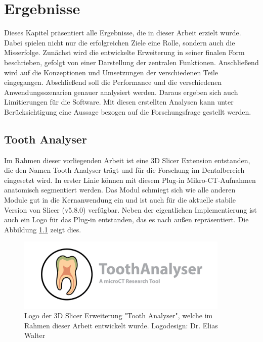 \chapter{Ergebnisse}
\label{chap:ergebnisse} Dieses Kapitel präsentiert alle Ergebnisse, die in
dieser Arbeit erzielt wurde. Dabei spielen nicht nur die erfolgreichen Ziele eine
Rolle, sondern auch die Misserfolge. Zunächst wird die entwickelte Erweiterung in
seiner finalen Form beschrieben, gefolgt von einer Darstellung der zentralen
Funktionen. Anschließend wird auf die Konzeptionen und Umsetzungen der verschiedenen
Teile eingegangen. Abschließend soll die Performance und die verschiedenen
Anwendungsszenarien genauer analysiert werden. Daraus ergeben sich auch Limitierungen
für die Software. Mit diesen erstellten Analysen kann unter Berücksichtigung
eine Aussage bezogen auf die Forschungsfrage gestellt werden.

\section{Tooth Analyser}
\label{sec:tooth_analyser} Im Rahmen dieser vorliegenden Arbeit ist eine 3D
Slicer Extension entstanden, die den Namen Tooth Analyser trägt und für die Forschung
im Dentalbereich eingesetzt wird. In erster Linie können mit diesem Plug-in
Mikro-CT-Aufnahmen anatomisch segmentiert werden. Das Modul schmiegt sich wie alle
anderen Module gut in die Kernanwendung ein und ist auch für die aktuelle stabile
Version von Slicer (v5.8.0) verfügbar. Neben der eigentlichen Implementierung
ist auch ein Logo für das Plug-in entstanden, das es nach außen repräsentiert.
Die Abbildung \ref{fig:logo_tooth_analyser} zeigt dies.

\begin{figure}[h]
	\centering
	\includegraphics[width=0.9\textwidth]{img/SlicerToothAnalyser.png}
	\caption{Logo der 3D Slicer Erweiterung "Tooth Analyser", welche im Rahmen dieser
	Arbeit entwickelt wurde. Logodesign: Dr. Elias Walter}
	\label{fig:logo_tooth_analyser}
\end{figure}

